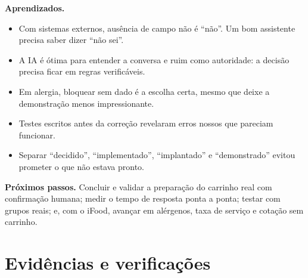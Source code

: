\documentclass[11pt,a4paper]{article}
\begin{document}
\textbf{Aprendizados.}
\begin{itemize}
  \item Com sistemas externos, ausência de campo não é ``não''. Um bom assistente precisa saber dizer ``não sei''.
  \item A IA é ótima para entender a conversa e ruim como autoridade: a decisão precisa ficar em regras verificáveis.
  \item Em alergia, bloquear sem dado é a escolha certa, mesmo que deixe a demonstração menos impressionante.
  \item Testes escritos antes da correção revelaram erros nossos que pareciam funcionar.
  \item Separar ``decidido'', ``implementado'', ``implantado'' e ``demonstrado'' evitou prometer o que não estava pronto.
\end{itemize}

\textbf{Próximos passos.} Concluir e validar a preparação do carrinho real com confirmação humana; medir o tempo de resposta ponta a ponta; testar com grupos reais; e, com o iFood, avançar em alérgenos, taxa de serviço e cotação sem carrinho.
\fi

\newpage
\appendix
\section{Evidências e verificações}\label{anx:evidencias}
\end{document}
